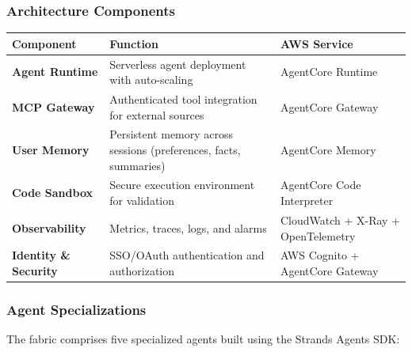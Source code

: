 \subsubsection{Architecture Components}\label{architecture-components}

{\def\LTcaptype{none} %
\begin{longtable}[]{@{}
  >{\raggedright\arraybackslash}p{}
  >{\raggedright\arraybackslash}p{}
  >{\raggedright\arraybackslash}p{}@{}}
\toprule\noalign{}
\begin{minipage}[b]{\linewidth}\raggedright
Component
\end{minipage} & \begin{minipage}[b]{\linewidth}\raggedright
Function
\end{minipage} & \begin{minipage}[b]{\linewidth}\raggedright
AWS Service
\end{minipage} \\
\midrule\noalign{}
\endhead
\bottomrule\noalign{}
\endlastfoot
\textbf{Agent Runtime} & Serverless agent deployment with auto-scaling &
AgentCore Runtime \\
\textbf{MCP Gateway} & Authenticated tool integration for external
sources & AgentCore Gateway \\
\textbf{User Memory} & Persistent memory across sessions (preferences,
facts, summaries) & AgentCore Memory \\
\textbf{Code Sandbox} & Secure execution environment for validation &
AgentCore Code Interpreter \\
\textbf{Observability} & Metrics, traces, logs, and alarms & CloudWatch
+ X-Ray + OpenTelemetry \\
\textbf{Identity \& Security} & SSO/OAuth authentication and
authorization & AWS Cognito + AgentCore Gateway \\
\end{longtable}
}

\subsubsection{Agent Specializations}\label{agent-specializations}

The fabric comprises five specialized agents built using the Strands
Agents SDK:

